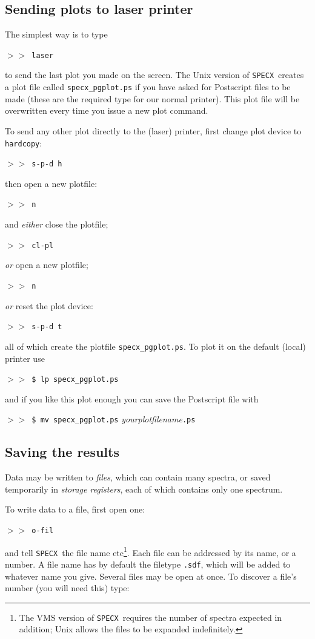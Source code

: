 \documentclass[11pt,twoside]{starlink}
\providecommand{\SPECX}{\texttt{SPECX}}
\providecommand{\margnote}[1]
{\marginpar{({\it{\ref{#1}}})}}
\providecommand{\SP}{{$>\!>$}}
\begin{document}
\subsection{Sending plots to laser printer}
The \margnote{sec:specx_12} simplest way is to type

\SP\ {\tt{laser}}

to send the last plot you made on the screen. The Unix version of
\SPECX\ creates a plot file called \verb|specx_pgplot.ps| if you have
asked for Postscript files to be made (these are the required type for
our normal printer). This plot file will be overwritten every time you
issue a new plot command.

To send any other plot directly to the (laser) printer, first change plot
device to {\tt{hardcopy}}:

\SP\ {\tt{s-p-d h}}

then open a new plotfile:

\SP\ {\tt{n}}

and {\it{either}} close the plotfile;

\SP\ {\tt{cl-pl}}

\textit{or} open a new plotfile;

\SP\ {\tt{n}}

{\it{or}} reset the plot device:

\SP\ {\tt{s-p-d t}}

all of which create the plotfile \verb|specx_pgplot.ps|.
To plot it on the default (local) printer use

\SP\ \verb|$ lp specx_pgplot.ps|

and if you like this plot enough you can save the Postscript file with

\SP\ \verb|$ mv specx_pgplot.ps| {\it{yourplotfilename}}{\tt{.ps}}

\normalmarginpar
\subsection{Saving the results}
Data may be written to {\it{files}}, which can contain many spectra, or
saved temporarily in {\it{storage registers}}, each of which contains
only one spectrum.

To write data to a file, first open one\margnote{sec:data-files}:

\SP\ {\tt{o-fil}}

and tell \SPECX\ the file name etc\footnote{The VMS version of \SPECX\
requires the number of spectra expected in addition; Unix allows the
files to be expanded indefinitely.}. Each file can be addressed by its
name, or a number. A file name has by default the filetype {\tt{.sdf}},
which will be added to whatever name you give. Several files may be
open at once. To discover a file's number (you will need this) type:
\end{document}

